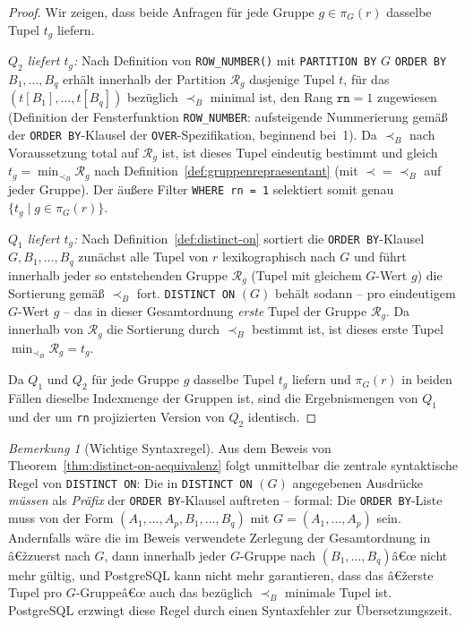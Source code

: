 ﻿\documentclass[a4paper,12pt]{report}
\theoremstyle{definition}
\theoremstyle{remark}
\newtheorem{remark}{Bemerkung}[chapter]
\newcommand{\R}{\mathcal{R}}
\begin{document}
\begin{proof}
Wir zeigen, dass beide Anfragen für jede Gruppe $g\in\pi_G(r)$
dasselbe Tupel $t_g$ liefern.

\emph{$Q_2$ liefert $t_g$:} Nach Definition von \texttt{ROW\_NUMBER()}
mit \texttt{PARTITION BY} $G$ \texttt{ORDER BY} $B_1,\ldots,B_q$
erhält innerhalb der Partition $\R_g$ dasjenige Tupel $t$, für das
$(t[B_1],\ldots,t[B_q])$ bezüglich $\prec_B$ minimal ist, den Rang
$\texttt{rn}=1$ zugewiesen (Definition der Fensterfunktion
\texttt{ROW\_NUMBER}: aufsteigende Nummerierung gemäß der
\texttt{ORDER BY}-Klausel der \texttt{OVER}-Spezifikation, beginnend
bei~1). Da $\prec_B$ nach Voraussetzung total auf $\R_g$ ist, ist
dieses Tupel eindeutig bestimmt und gleich $t_g=\min_{\prec_B}\R_g$
nach Definition~\ref{def:gruppenrepraesentant} (mit $\prec=\prec_B$
auf jeder Gruppe). Der äußere Filter \texttt{WHERE rn = 1} selektiert
somit genau $\{t_g \mid g\in\pi_G(r)\}$.

\emph{$Q_1$ liefert $t_g$:} Nach Definition~\ref{def:distinct-on}
sortiert die \texttt{ORDER BY}-Klausel $G,B_1,\ldots,B_q$ zunächst
alle Tupel von $r$ lexikographisch nach $G$ und führt innerhalb jeder
so entstehenden Gruppe $\R_g$ (Tupel mit gleichem $G$-Wert $g$) die
Sortierung gemäß $\prec_B$ fort. \texttt{DISTINCT ON} $(G)$ behält
sodann -- pro eindeutigem $G$-Wert $g$ -- das in dieser Gesamtordnung
\emph{erste} Tupel der Gruppe $\R_g$. Da innerhalb von $\R_g$ die
Sortierung durch $\prec_B$ bestimmt ist, ist dieses erste Tupel
$\min_{\prec_B}\R_g=t_g$.

Da $Q_1$ und $Q_2$ für jede Gruppe $g$ dasselbe Tupel $t_g$ liefern
und $\pi_G(r)$ in beiden Fällen dieselbe Indexmenge der Gruppen ist,
sind die Ergebnismengen von $Q_1$ und der um \texttt{rn} projizierten
Version von $Q_2$ identisch. \qedhere
\end{proof}

\begin{remark}[Wichtige Syntaxregel]
\label{rem:distinct-on-regel}
Aus dem Beweis von Theorem~\ref{thm:distinct-on-aequivalenz} folgt
unmittelbar die zentrale syntaktische Regel von
\texttt{DISTINCT ON}: Die in \texttt{DISTINCT ON} $(G)$ angegebenen
Ausdrücke \emph{müssen} als \emph{Präfix} der \texttt{ORDER
BY}-Klausel auftreten -- formal: Die \texttt{ORDER BY}-Liste muss von
der Form $(A_1,\ldots,A_p,B_1,\ldots,B_q)$ mit $G=(A_1,\ldots,A_p)$
sein. Andernfalls wäre die im Beweis verwendete Zerlegung der
Gesamtordnung in â€žzuerst nach $G$, dann innerhalb jeder $G$-Gruppe
nach $(B_1,\ldots,B_q)$â€œ nicht mehr gültig, und PostgreSQL kann nicht
mehr garantieren, dass das â€žerste Tupel pro $G$-Gruppeâ€œ auch das
bezüglich $\prec_B$ minimale Tupel ist. PostgreSQL erzwingt diese
Regel durch einen Syntaxfehler zur Übersetzungszeit.
\end{remark}
\end{document}
